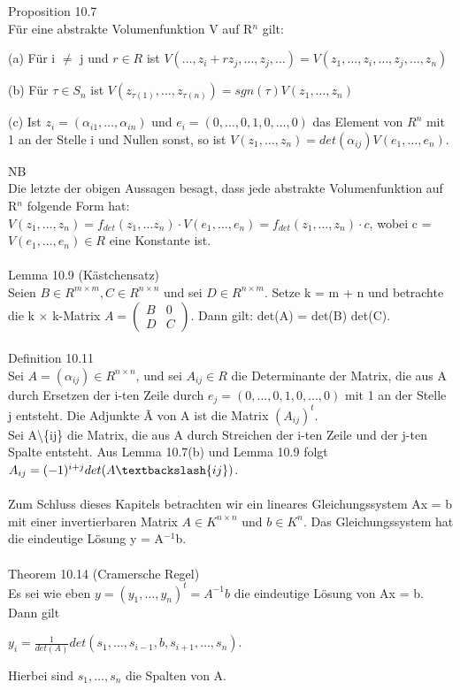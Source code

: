 Proposition 10.7\\
Für eine abstrakte Volumenfunktion V auf R$^n$ gilt:
\begin{compactenum}
\item[(a)] Für i $\neq$ j und $r \in R$ ist $V(…, z_i + rz_j, …, z_j, …) = V(z_1, …, z_i, …, z_j, …, z_n)$
\item[(b)] Für $\tau \in S_n$ ist $V(z_{\tau(1)}, …, z_{\tau(n)}) = sgn(\tau)V(z_1, …, z_n)$
\item[(c)] Ist $z_i = (\alpha_{i1}, …, \alpha_{in})$ und $e_i = (0, …, 0, 1, 0, …, 0)$ das Element von $R^n$ mit 1 an der Stelle i und Nullen sonst, so ist $V(z_1, …, z_n) = det(\alpha_{ij}) V(e_1, …, e_n)$.\\
\end{compactenum}
NB\\
Die letzte der obigen Aussagen besagt, dass jede abstrakte Volumenfunktion auf R$^n$ folgende Form hat:
$V (z_1, …, z_n) = f_{det}(z_1, … z_n) \cdot V (e_1, …, e_n) = f_{det}(z_1, …, z_n) \cdot c$, wobei c = $V (e_1,…, e_n) \in R$ eine Konstante ist.\\
\\
Lemma 10.9 (Kästchensatz)\\
Seien $B \in R^{m \times m},C \in R^{n \times n}$ und sei $D \in R^{n \times m}$. Setze k = m + n und betrachte die k $\times$ k-Matrix $A = \begin{pmatrix} B & 0 \\ D & C \end{pmatrix}$. Dann gilt: det(A) = det(B) det(C).\\
\\
\newpage
Definition 10.11\\
Sei $A = (\alpha_{ij}) \in R^{n \times n}$, und sei $A_{ij} \in R$ die Determinante der Matrix, die aus A durch Ersetzen der i-ten Zeile durch $e_j = (0,...,0,1,0,...,0)$ mit 1 an der Stelle j entsteht. Die Adjunkte \~{A} von A ist die Matrix $(A_{ij})^t$.\\
Sei A\textbackslash\{ij\} die Matrix, die aus A durch Streichen der i-ten Zeile und der j-ten Spalte entsteht. Aus Lemma 10.7(b) und Lemma 10.9 folgt $A_{ij} =(-1)^{i+j} det(A\textbackslash\{ij\})$.\\
\\
Zum Schluss dieses Kapitels betrachten wir ein lineares Gleichungssystem Ax = b mit einer invertierbaren Matrix $A \in K^{n \times n}$ und $b \in K^n$. Das Gleichungssystem hat die eindeutige Lösung y = A$^{-1}$b.\\
\\
Theorem 10.14 (Cramersche Regel)\\
Es sei wie eben $y = (y_1, …, y_n)^t = A^{-1}b$ die eindeutige Lösung von Ax = b. Dann gilt
\begin{center}
$y_i = \frac{1}{det(A)} det(s_1, …, s_{i-1}, b, s_{i+1}, …, s_n)$.
\end{center}
Hierbei sind $s_1, …, s_n$ die Spalten von A.\\
